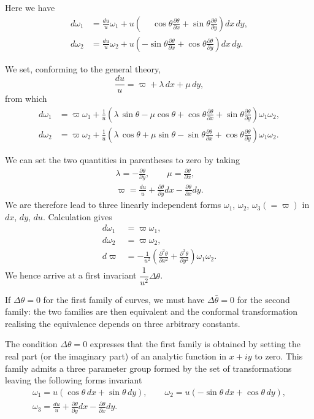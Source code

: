 \documentclass[leqno,11pt]{article}
\newcommand{\pd}{\partial}
\theoremstyle{shape1}
\theoremstyle{shape0}
\theoremstyle{shape2}
\theoremstyle{definition}
\newcommand{\vp}{\varpi}
\begin{document}
Here we have
\begin{align*}
  d\omega_{1}&=\frac{du}{u}\omega_{1}+u\left(\phantom{+}\cos\theta\frac{\pd \theta}{\pd x}+\sin\theta\frac{\pd\theta}{\pd y}\right)dx\,dy,\\
  d\omega_{2}&=\frac{du}{u}\omega_{2}+u\left(-\sin\theta\frac{\pd \theta}{\pd x}+\cos\theta\frac{\pd\theta}{\pd y}\right)dx\,dy.
\end{align*}

We set, conforming to the general theory,
\[
\frac{du}{u}=\vp+\lambda\,dx+\mu\,dy,
\]
from which
\begin{align*}
  d\omega_{1}&=\vp\omega_{1}+\frac{1}{u}\left(\lambda\,\sin\theta-\mu\cos\theta+\cos\theta\frac{\pd\theta}{\pd x}+\sin\theta\frac{\pd\theta}{\pd y}\right)\omega_{1}\omega_{2},\\
  d\omega_{2}&=\vp\omega_{2}+\frac{1}{u}\left(\lambda\,\cos\theta+\mu\sin\theta-\sin\theta\frac{\pd\theta}{\pd x}+\cos\theta\frac{\pd\theta}{\pd y}\right)\omega_{1}\omega_{2}.
\end{align*}

We can set the two quantities in parentheses to zero by taking
\begin{gather*}
  \lambda=-\frac{\pd\theta}{\pd y},\qquad\mu=\frac{\pd\theta}{\pd x},\\
  \vp=\frac{du}{u}+\frac{\pd\theta}{\pd y}dx-\frac{\pd\theta}{\pd x}dy.
\end{gather*}
We are therefore lead to three linearly independent forms $\omega_{1}$, $\omega_{2}$, $\omega_{3}(=\vp)$ in $dx$, $dy$, $du$. Calculation gives
\begin{align*}
  d\omega_{1}&=\vp\omega_{1},\\
  d\omega_{2}&=\vp\omega_{2},\\
  d\vp&=-\frac{1}{u^{2}}\left(\frac{\pd^{2}\theta}{\pd x^{2}}+\frac{\pd^{2}\theta}{\pd y^{2}}\right)\omega_{1}\omega_{2}.
\end{align*}
We hence arrive at a first invariant $\dfrac{1}{u^{2}}\Delta\theta$.

If $\Delta\theta=0$ for the first family of curves, we must have $\Delta\bar\theta=0$ for the second family: the two families are then equivalent and the conformal transformation realising the equivalence depends on three arbitrary constants.

The condition $\Delta\theta=0$ expresses that the first family is obtained by setting the real part (or the imaginary part) of an analytic function in $x+iy$ to zero. This family admits a three parameter group formed by the set of transformations leaving the following forms invariant
\begin{gather*}
  \omega_{1}=u(\cos\theta\,dx+\sin\theta\,dy),\qquad\omega_{2}=u(-\sin\theta\,dx+\cos\theta\,dy),\\
  \omega_{3}=\frac{du}{u}+\frac{\pd \theta}{\pd y}dx-\frac{\pd \theta}{\pd x}dy.
\end{gather*}
\end{document}
